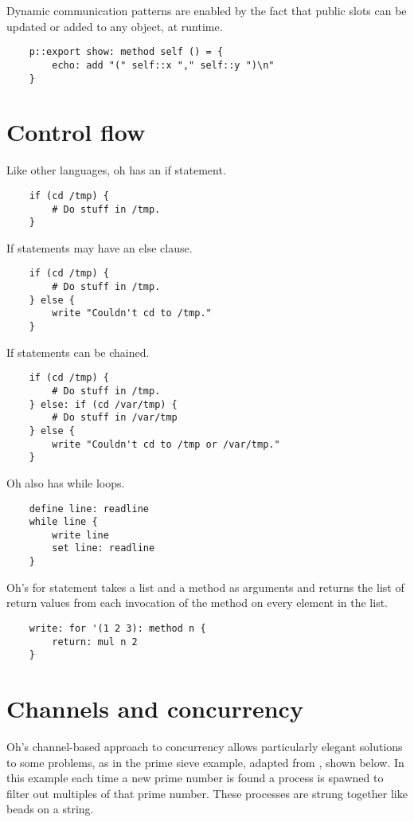 \documentclass[12pt]{book}
\begin{document}
Dynamic communication patterns are enabled by the fact that public slots
can be updated or added to any object, at runtime.

\begin{lstlisting}
	p::export show: method self () = {
		echo: add "(" self::x "," self::y ")\n"
	}
\end{lstlisting}


\section{Control flow}

Like other languages, oh has an if statement.

\begin{lstlisting}
	if (cd /tmp) {
		# Do stuff in /tmp.
	}
\end{lstlisting}

If statements may have an else clause.

\begin{lstlisting}
	if (cd /tmp) {
		# Do stuff in /tmp.
	} else {
		write "Couldn't cd to /tmp."
	}
\end{lstlisting}

If statements can be chained.

\begin{lstlisting}
	if (cd /tmp) {
		# Do stuff in /tmp.
	} else: if (cd /var/tmp) {
		# Do stuff in /var/tmp
	} else {
		write "Couldn't cd to /tmp or /var/tmp."
	}
\end{lstlisting}

Oh also has while loops.

\begin{lstlisting}
	define line: readline
	while line {
		write line
		set line: readline
	}
\end{lstlisting}

Oh's for statement takes a list and a method as arguments and returns the
list of return values from each invocation of the method on every element
in the list.

\begin{lstlisting}
	write: for '(1 2 3): method n {
	    return: mul n 2
	}
\end{lstlisting}


\section{Channels and concurrency}

Oh's channel-based approach to concurrency allows particularly elegant
solutions to some problems, as in the prime sieve example, adapted
from \cite{NALfCwM}, shown below. In this example each time a new prime
number is found a process is spawned to filter out multiples of that
prime number. These processes are strung together like beads on a string.
\end{document}
